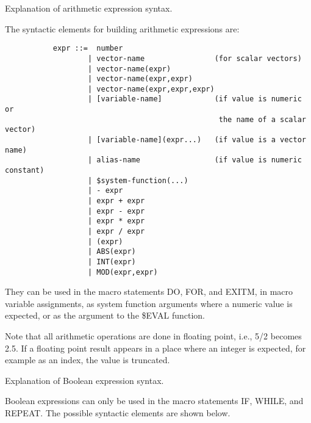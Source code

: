 \fi


   \par
Explanation of arithmetic expression syntax.  

   \par
The syntactic elements for building arithmetic expressions are:  

\begin{verbatim}
           expr ::=  number
                   | vector-name                (for scalar vectors)
                   | vector-name(expr)
                   | vector-name(expr,expr)
                   | vector-name(expr,expr,expr)
                   | [variable-name]            (if value is numeric or
                                                 the name of a scalar vector)
                   | [variable-name](expr...)   (if value is a vector name)
                   | alias-name                 (if value is numeric constant)
                   | $system-function(...)
                   | - expr
                   | expr + expr
                   | expr - expr
                   | expr * expr
                   | expr / expr
                   | (expr)
                   | ABS(expr)
                   | INT(expr)
                   | MOD(expr,expr)
\end{verbatim}
\ENDVERB
   \par
They can be used in the macro statements DO, FOR, and EXITM, in macro 
   variable assignments, as system function arguments where a numeric value is 
   expected, or as the argument to the \$EVAL function.  

   \par
Note that all arithmetic operations are done in floating point, i.e., 
   \DQUOTE{}5/2\DQUOTE{} becomes \DQUOTE{}2.5\DQUOTE{}. If a floating point 
   result appears in a place where an integer is expected, for example as an 
   index, the value is truncated.  

\ENDCMD


   \par
Explanation of Boolean expression syntax.  

   \par
Boolean expressions can only be used in the macro statements IF, WHILE, and 
   REPEAT. The possible syntactic elements are shown below.  

